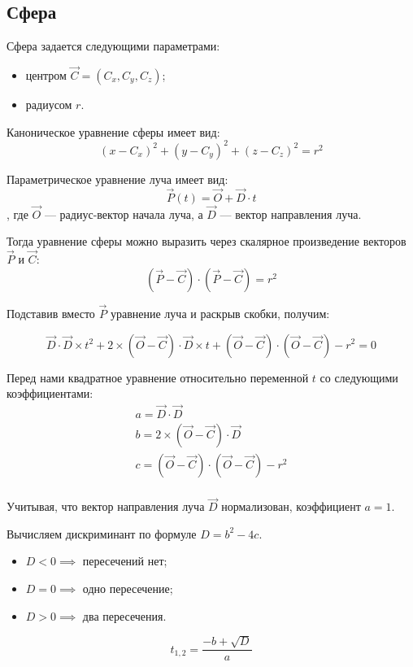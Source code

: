 \subsection{Сфера}
Сфера задается следующими параметрами:

\begin{itemize}
	\item центром $\vec{C} = (C_x, C_y, C_z)$;
	\item радиусом $r$.
\end{itemize}

Каноническое уравнение сферы имеет вид:
\[
	(x - C_x)^2 + (y - C_y)^2 + (z - C_z)^2 = r^2
\]

Параметрическое уравнение луча имеет вид:
\[
	\vec{P}(t) = \vec{O} + \vec{D} \cdot t
\]
, где
$\vec{O}$ --- радиус-вектор начала луча, а $\vec{D}$ --- вектор направления луча.

Тогда уравнение сферы можно выразить через скалярное произведение векторов $\vec{P}$ и $\vec{C}$:
\[
	(\vec{P} - \vec{C}) \cdot (\vec{P} - \vec{C}) = r^2
\]

Подставив вместо $\vec{P}$ уравнение луча и раскрыв скобки, получим:

\[
	\vec{D} \cdot \vec{D} \times t^2 + 2 \times (\vec{O} - \vec{C}) \cdot \vec{D} \times t + (\vec{O} - \vec{C}) \cdot (\vec{O} - \vec{C}) - r^2 = 0
\]

Перед нами квадратное уравнение относительно переменной $t$ со следующими коэффициентами:
\begin{gather*}
	a = \vec{D} \cdot \vec{D}                  \\
	b = 2 \times (\vec{O} - \vec{C}) \cdot \vec{D}   \\
	c = (\vec{O} - \vec{C}) \cdot (\vec{O} - \vec{C}) - r^2 \\
\end{gather*}

Учитывая, что вектор направления луча $\vec{D}$ нормализован, коэффициент $a = 1$.

Вычисляем дискриминант по формуле $D = b^2 - 4 c$.

\begin{itemize}
	\item $D < 0 \implies$ пересечений нет;
	\item $D = 0 \implies$ одно пересечение;
	\item $D > 0 \implies$ два пересечения.
\end{itemize}

\[
	t_{1,2} = \frac{-b + \sqrt{D}}{a}
\]


